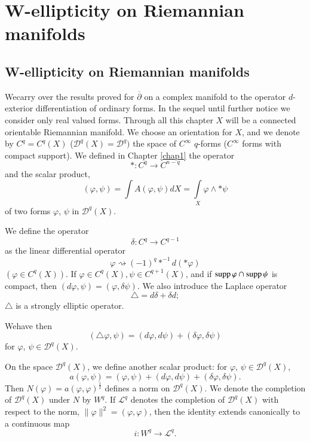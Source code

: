 \chapter{W-ellipticity on Riemannian manifolds}\label{chap2}%


\setcounter{section}{4}
\section{W-ellipticity on Riemannian manifolds}%

We\pageoriginale carry over the results proved for $
\overline{\partial}$ on a complex manifold to the operator
$d$-exterior differentiation of 
ordinary forms. In the sequel until further notice we consider only
real valued forms. Through all this chapter $X$ will be a connected
orientable Riemannian manifold. We choose an orientation for $X$, and we
denote by $C^q = C^q(X)$ (\resp $\mathscr{D}^q(X) = \mathscr{D}^q)$ the
space of $C^{\infty}$ $q$-forms (\resp $C^{\infty}$ forms with compact
support). We defined in Chapter \ref{chap1} the operator  
$$
* : C^q \rightarrow C^{n-q}
$$
and the scalar product,
$$
(\varphi, \psi) = \int A(\varphi, \psi)dX = \int\limits_{X} \varphi
\wedge * \psi 
$$
of two forms $\varphi$, $\psi$ in $\mathscr{D}^{q}(X)$.

We define the operator
$$ 
\delta : C^{q} \longrightarrow C^{q-1}
$$
as the linear differential operator
$$ 
\varphi \rightsquigarrow (-1)^{q}*^{-1} d(* \varphi)
$$
$(\varphi \in C^{q}(X))$. If $\varphi \in C^{q}(X), \psi \in
C^{q+1}(X)$, and if $\operatorname{supp} \varphi \cap \operatorname{supp} \psi$ is compact, then
$(d\varphi, \psi) = (\varphi, \delta\psi )$. We also introduce the
Laplace operator 
$$ 
\triangle = d \delta + \delta d ;
$$
$\triangle$ is a strongly elliptic operator. 

We\pageoriginale have then
$$ 
(\triangle \varphi,\psi )=(d\varphi,d\psi )+(\delta\varphi,\delta \psi)
$$
for $\varphi$, $\psi \in \mathscr{D}^{q}(X)$.

On the space $\mathscr{D}^{q}(X)$, we define another scalar product:
for $\varphi$, $\psi \in \mathscr{D}^q (X)$,
$$
a(\varphi,\psi)=(\varphi,\psi)+ 
 (d\varphi,  d\psi) + (\delta \varphi,\delta \psi).
$$
  Then  $N(\varphi) = a (\varphi,\varphi)^{\frac{1}{2} }$ defines a
  norm on $\mathscr{D}^q(X)$. We denote the completion of
  $\mathscr{D}^q(X)$ under $N$ by $W^q$. If $\mathcal{L}^q$ denotes
  the completion of 
  $\mathscr{D}^q(X)$ with respect to the norm, $\parallel \varphi
  \parallel^2=(\varphi,\varphi)$,  
  then the identity extends canonically to a continuous map 
  $$ 
  i:W^q\longrightarrow \mathcal{L}^q. 
  $$
   
